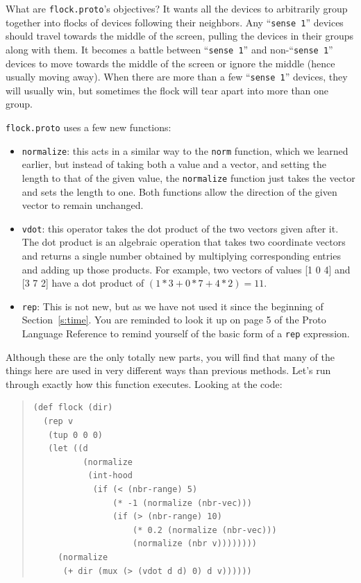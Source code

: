 \documentclass{article}
\newcommand\var[1]{{\tt #1}}
\newcommand\qvar[1]{``{\tt #1}''}
\begin{document}
What are \var{flock.proto}'s objectives?  It wants all the devices to
arbitrarily group together into flocks of devices following their
neighbors.  Any \qvar{sense 1} devices should travel towards the
middle of the screen, pulling the devices in their groups along with
them.  It becomes a battle between \qvar{sense 1} and non-\qvar{sense
  1} devices to move towards the middle of the screen or ignore the
middle (hence usually moving away).  When there are more than a few
\qvar{sense 1} devices, they will usually win, but sometimes the flock
will tear apart into more than one group.

\var{flock.proto} uses a few new functions:
\begin{itemize}
\item \var{normalize}: this acts in a similar way to the \var{norm}
  function, which we learned earlier, but instead of taking both a
  value and a vector, and setting the length to that of the given
  value, the \var{normalize} function just takes the vector and sets
  the length to one.  Both functions allow the direction of the
  given vector to remain unchanged.
\item \var{vdot}: this operator takes the dot product of the two
  vectors given after it.  The dot product is an algebraic operation
  that takes two coordinate vectors and returns a single number
  obtained by multiplying corresponding entries and adding up those
  products.  For example, two vectors of values [1 0 4] and [3 7 2]
  have a dot product of $(1 * 3 + 0 * 7 + 4 * 2) = 11$.
\item \var{rep}: This is not new, but as we have not used it since the
  beginning of Section~\ref{s:time}.  You are reminded to look it up
  on page 5 of the Proto Language Reference to remind yourself of the
  basic form of a \var{rep} expression.
\end{itemize}

Although these are the only totally new parts, you will find that many
of the things here are used in very different ways than previous
methods.  Let's run through exactly how this function executes.  Looking
at the code:
	
\begin{quote}
\begin{verbatim}
(def flock (dir)
  (rep v
   (tup 0 0 0)
   (let ((d
          (normalize
           (int-hood
            (if (< (nbr-range) 5)
                (* -1 (normalize (nbr-vec)))
                (if (> (nbr-range) 10)
                    (* 0.2 (normalize (nbr-vec)))
                    (normalize (nbr v))))))))
     (normalize
      (+ dir (mux (> (vdot d d) 0) d v))))))
\end{verbatim}
\end{quote}
\end{document}
